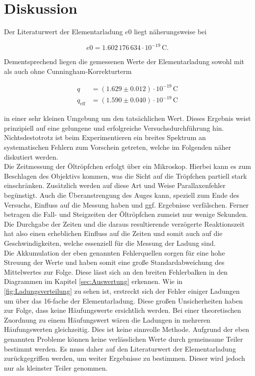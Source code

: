 


\section{Diskussion}
\label{sec:Diskussion}

Der Literaturwert \cite{Elementarladung} der Elementarladung $e0$ liegt näherungsweise bei 

\begin{equation*}
    e0 = 1.602\,176\,634\cdot{}10^{-19}\,\unit{\coulomb}.
\end{equation*}

\noindent Dementsprechend liegen die gemessenen Werte der Elementarladung sowohl mit als auch ohne Cunningham-Korrekturterm 

\begin{align*}
    q            &= \left(1.629\pm0.012\right)\cdot10^{-19}\,\unit{\coulomb} \\
    q_\text{eff} &= \left(1.590 \pm0.040\right)\cdot10^{-19}\,\unit{\coulomb} 
\end{align*}

in einer sehr kleinen Umgebung um den tatsächlichen Wert. Dieses Ergebnis weist prinzipiell auf eine gelungene und 
erfolgreiche Versuchsdurchführung hin. Nichtsdestotrotz ist beim Experimentieren ein breites Spektrum an systematischen 
Fehlern zum Vorschein getreten, welche im Folgenden näher diskutiert werden.\\

\noindent Die Zeitmessung der Öltröpfchen erfolgt über ein Mikroskop. Hierbei kann es zum Beschlagen des Objektivs 
kommen, was die Sicht auf die Tröpfchen partiell stark einschränken. Zusätzlich werden auf diese Art und Weise 
Parallaxenfehler begünstigt. Auch die Überanstrengung des Auges kann, speziell zum Ende des Versuchs, Einfluss auf die 
Messung haben und ggf. Ergebnisse verfälschen. Ferner betragen die Fall- und Steigzeiten der Öltröpfchen zumeist nur 
wenige Sekunden. Die Durchgabe der Zeiten und die daraus resultierende verzögerte Reaktionszeit hat also einen erheblichen 
Einfluss auf die Zeiten und somit auch auf die Geschwindigkeiten, welche essenziell für die Messung der Ladung sind.\\

\noindent Die Akkumulation der eben genannten Fehlerquellen sorgen für eine hohe Streuung der Werte und haben somit 
eine große Standardabweichung des Mittelwertes zur Folge. Diese lässt sich an den breiten Fehlerbalken in den Diagrammen 
im Kapitel \ref{sec:Auswertung} erkennen. Wie in \autoref{fig:Ladungsverteilung} zu sehen ist, erstreckt sich der Fehler 
einiger Ladungen um über das 16-fache der Elementarladung. Diese großen Unsicherheiten haben zur Folge, dass keine 
Häufungswerte ersichtlich werden. Bei einer theoretischen Zuordnung zu einem Häufungswert wären die Ladungen in mehreren 
Häufungswerten gleichzeitig. Dies ist keine sinnvolle Methode. Aufgrund der eben genannten Probleme können keine 
verlässlichen Werte durch gemeinsame Teiler bestimmt werden. Es muss daher auf den Literaturwert der Elementarladung 
zurückgegriffen werden, um weiter Ergebnisse zu bestimmen. Dieser wird jedoch nur als kleinster Teiler genommen. 


